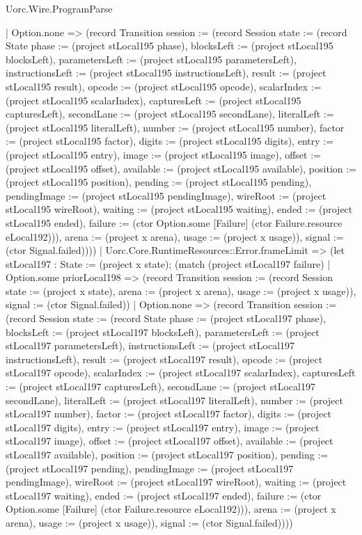 \begin{lexlean}{Uorc.Wire.ProgramParse}
\begin{semanticmodule}
{        | Option.none => (record Transition {session := (record Session {state := (record State {phase := (project stLocal195 phase), blocksLeft := (project stLocal195 blocksLeft), parametersLeft := (project stLocal195 parametersLeft), instructionsLeft := (project stLocal195 instructionsLeft), result := (project stLocal195 result), opcode := (project stLocal195 opcode), scalarIndex := (project stLocal195 scalarIndex), capturesLeft := (project stLocal195 capturesLeft), secondLane := (project stLocal195 secondLane), literalLeft := (project stLocal195 literalLeft), number := (project stLocal195 number), factor := (project stLocal195 factor), digits := (project stLocal195 digits), entry := (project stLocal195 entry), image := (project stLocal195 image), offset := (project stLocal195 offset), available := (project stLocal195 available), position := (project stLocal195 position), pending := (project stLocal195 pending), pendingImage := (project stLocal195 pendingImage), wireRoot := (project stLocal195 wireRoot), waiting := (project stLocal195 waiting), ended := (project stLocal195 ended), failure := (ctor Option.some [Failure] (ctor Failure.resource eLocal192))}), arena := (project x arena), usage := (project x usage)}), signal := (ctor Signal.failed)})))
      | Uorc.Core.RuntimeResources::Error.frameLimit => (let stLocal197 : State := (project x state); (match (project stLocal197 failure)
        | Option.some priorLocal198 => (record Transition {session := (record Session {state := (project x state), arena := (project x arena), usage := (project x usage)}), signal := (ctor Signal.failed)})
        | Option.none => (record Transition {session := (record Session {state := (record State {phase := (project stLocal197 phase), blocksLeft := (project stLocal197 blocksLeft), parametersLeft := (project stLocal197 parametersLeft), instructionsLeft := (project stLocal197 instructionsLeft), result := (project stLocal197 result), opcode := (project stLocal197 opcode), scalarIndex := (project stLocal197 scalarIndex), capturesLeft := (project stLocal197 capturesLeft), secondLane := (project stLocal197 secondLane), literalLeft := (project stLocal197 literalLeft), number := (project stLocal197 number), factor := (project stLocal197 factor), digits := (project stLocal197 digits), entry := (project stLocal197 entry), image := (project stLocal197 image), offset := (project stLocal197 offset), available := (project stLocal197 available), position := (project stLocal197 position), pending := (project stLocal197 pending), pendingImage := (project stLocal197 pendingImage), wireRoot := (project stLocal197 wireRoot), waiting := (project stLocal197 waiting), ended := (project stLocal197 ended), failure := (ctor Option.some [Failure] (ctor Failure.resource eLocal192))}), arena := (project x arena), usage := (project x usage)}), signal := (ctor Signal.failed)})))
}
\end{semanticmodule}
\end{lexlean}
